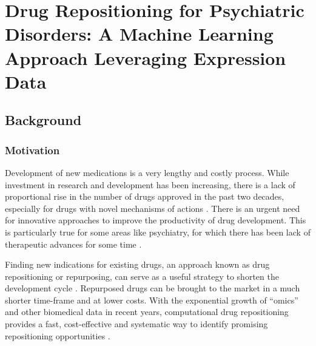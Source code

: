 \chapter{Drug Repositioning for Psychiatric Disorders: A Machine Learning Approach Leveraging Expression Data}
\label{chap:Repurposing}

\section{Background}
  \subsection{Motivation}
    Development of new medications is a very lengthy and costly process. While investment in research and development has been increasing, there is a lack of proportional rise in the number of drugs approved in the past two decades, especially for drugs with novel mechanisms of actions \cite{pammolli2011productivity}. There is an urgent need for innovative approaches to improve the productivity of drug development. This is particularly true for some areas like psychiatry, for which there has been lack of therapeutic advances for some time \cite{krystal2014psychiatric,hyman2013psychiatric}.
    
    Finding new indications for existing drugs, an approach known as drug repositioning or repurposing, can serve as a useful strategy to shorten the development cycle \cite{dudley2011exploiting}. Repurposed drugs can be brought to the market in a much shorter time-frame and at lower costs. With the exponential growth of “omics” and other biomedical data in recent years, computational drug repositioning provides a fast, cost-effective and systematic way to identify promising repositioning opportunities \cite{dudley2011exploiting}.

